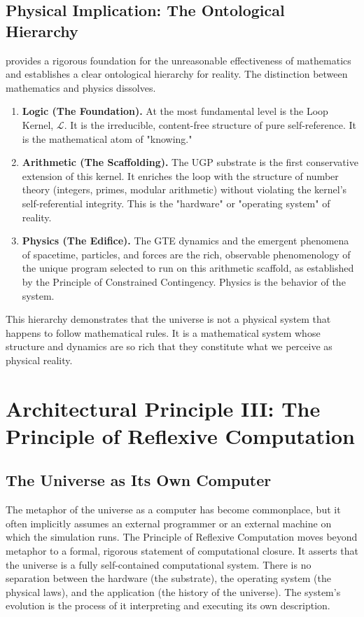 \documentclass[12pt]{article}
\newcommand{\scL}{\mathscr{L}}
\begin{document}
\subsection{Physical Implication: The Ontological Hierarchy}
 provides a rigorous foundation for the unreasonable effectiveness of mathematics and establishes a clear ontological hierarchy for reality. The distinction between mathematics and physics dissolves.
\begin{enumerate}[label=\textbf{Layer \arabic*:}, itemsep=0.5em, leftmargin=*]
    \item \textbf{Logic (The Foundation).} At the most fundamental level is the Loop Kernel, $\scL$. It is the irreducible, content-free structure of pure self-reference. It is the mathematical atom of "knowing."
    \item \textbf{Arithmetic (The Scaffolding).} The UGP substrate is the first conservative extension of this kernel. It enriches the loop with the structure of number theory (integers, primes, modular arithmetic) without violating the kernel's self-referential integrity. This is the "hardware" or "operating system" of reality.
    \item \textbf{Physics (The Edifice).} The GTE dynamics and the emergent phenomena of spacetime, particles, and forces are the rich, observable phenomenology of the unique program selected to run on this arithmetic scaffold, as established by the Principle of Constrained Contingency. Physics is the behavior of the system.
\end{enumerate}
This hierarchy demonstrates that the universe is not a physical system that happens to follow mathematical rules. It is a mathematical system whose structure and dynamics are so rich that they constitute what we perceive as physical reality.

\section{Architectural Principle III: The Principle of Reflexive Computation}
\label{sec:reflexive_computation}

\subsection{The Universe as Its Own Computer}
The metaphor of the universe as a computer has become commonplace, but it often implicitly assumes an external programmer or an external machine on which the simulation runs. The Principle of Reflexive Computation moves beyond metaphor to a formal, rigorous statement of computational closure. It asserts that the universe is a fully self-contained computational system. There is no separation between the hardware (the substrate), the operating system (the physical laws), and the application (the history of the universe). The system's evolution is the process of it interpreting and executing its own description.
\end{document}
